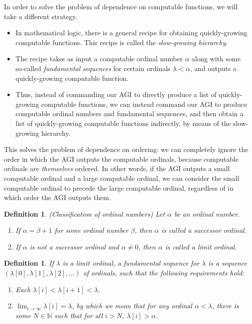 \documentclass{article}
\newtheorem{definition}[theorem]{Definition}
\begin{document}
In order to solve the problem of dependence on computable functions, we will take
a different strategy.
\begin{itemize}
    \item
    In mathematical logic, there is a general recipe for obtaining
    quickly-growing computable
    functions. This recipe is called the \emph{slow-growing hierarchy}.
    \item
    The recipe takes as input a computable
    ordinal number $\alpha$ along with some so-called \emph{fundamental
    sequences} for certain ordinals $\lambda<\alpha$, and outputs
    a quickly-growing computable function.
    \item
    Thus, instead of
    commanding our AGI to directly produce a list of quickly-growing computable functions,
    we can instead command our AGI to produce computable ordinal numbers and
    fundamental sequences, and then obtain a list of quickly-growing
    computable functions indirectly, by means of the slow-growing hierarchy.
\end{itemize}
This solves the problem of dependence on ordering: we can completely ignore the order
in which the AGI outputs the computable ordinals, because computable ordinals are
\emph{themselves} ordered. In other words, if the AGI outputs a small computable ordinal
and a large computable ordinal, we can consider the small computable ordinal to precede
the large computable ordinal, regardless of in which order the AGI outputs them.

\begin{definition}
    (Classification of ordinal numbers)
    Let $\alpha$ be an ordinal number.
    \begin{enumerate}
        \item
        If $\alpha=\beta+1$ for some ordinal number $\beta$, then $\alpha$ is called
        a \emph{successor ordinal}.
        \item
        If $\alpha$ is not a successor ordinal and $\alpha\neq 0$, then $\alpha$ is
        called a \emph{limit ordinal}.
    \end{enumerate}
\end{definition}

\begin{definition}
\label{fundamentalsequencedefn}
    If $\lambda$ is a limit ordinal, a \emph{fundamental sequence} for $\lambda$
    is a sequence $(\lambda[0],\lambda[1],\lambda[2],\ldots)$
    of ordinals, such that the following requirements hold:
    \begin{enumerate}
        \item
        Each $\lambda[i]<\lambda[i+1]<\lambda$.
        \item
        $\lim_{i\to\infty}\lambda[i]=\lambda$, by which we mean that for
        any ordinal $\alpha<\lambda$, there is some $N\in\mathbb N$ such that
        for all $i>N$, $\lambda[i]>\alpha$.
    \end{enumerate}
\end{definition}
\end{document}
